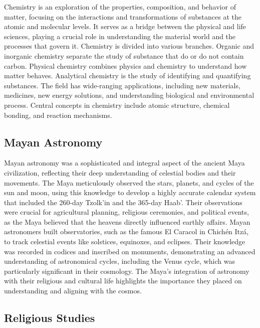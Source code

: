 \documentclass[12pt]{article}
\begin{document}
Chemistry is an exploration of the properties, composition, and behavior of matter, focusing on the interactions and transformations of substances at the atomic and molecular levels. It serves as a bridge between the physical and life sciences, playing a crucial role in understanding the material world and the processes that govern it. Chemistry is divided into various branches.  Organic and inorganic chemistry separate the study of substance that do or do not contain carbon.  Physical chemistry combines physics and chemistry to understand how matter behaves.  Analytical chemistry is the study of identifying and quantifying substances.  The field has wide-ranging applications, including new materials, medicines, new energy solutions, and understanding biological and environmental process. Central concepts in chemistry include atomic structure, chemical bonding, and reaction mechanisms.

\subsection{Mayan Astronomy}

Mayan astronomy was a sophisticated and integral aspect of the ancient Maya civilization, reflecting their deep understanding of celestial bodies and their movements. The Maya meticulously observed the stars, planets, and cycles of the sun and moon, using this knowledge to develop a highly accurate calendar system that included the 260-day Tzolk'in and the 365-day Haab'. Their observations were crucial for agricultural planning, religious ceremonies, and political events, as the Maya believed that the heavens directly influenced earthly affairs. Mayan astronomers built observatories, such as the famous El Caracol in Chichén Itzá, to track celestial events like solstices, equinoxes, and eclipses. Their knowledge was recorded in codices and inscribed on monuments, demonstrating an advanced understanding of astronomical cycles, including the Venus cycle, which was particularly significant in their cosmology. The Maya's integration of astronomy with their religious and cultural life highlights the importance they placed on understanding and aligning with the cosmos.

\subsection{Religious Studies}
\end{document}
